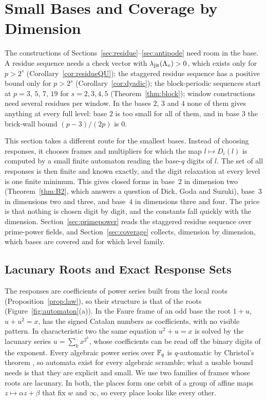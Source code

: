%
%
%
%
%
%
%
\section{Small Bases and Coverage by Dimension}\label{sec:frames}
The constructions of Sections~\ref{sec:residue}--\ref{sec:antipode} need room in the base. A residue sequence needs a check vector with $\lambda_{\mathrm{jit}}(\Lambda_v)>0$, which exists only for $p>2^s$ (Corollary~\ref{cor:residueQU}); the staggered residue sequence has a positive bound only for $p>2^s$ (Corollary~\ref{cor:dyadic}); the block-periodic sequences start at $p=3$, $5$, $7$, $19$ for $s=2,3,4,5$ (Theorem~\ref{thm:block}); window constructions need several residues per window. In the bases $2$, $3$ and $4$ none of them gives anything at every full level: base $2$ is too small for all of them, and in base $3$ the brick-wall bound $(p-3)/(2p)$ is $0$.

This section takes a different route for the smallest bases. Instead of choosing responses, it chooses frames and multipliers for which the map $l\mapsto D_i(l)$ is computed by a small finite automaton reading the base-$q$ digits of $l$. The set of all responses is then finite and known exactly, and the digit relaxation at every level is one finite minimum. This gives closed forms in base~$2$ in dimension two (Theorem~\ref{thm:B2}, which answers a question of Dick, Goda and Suzuki), base~$3$ in dimensions two and three, and base~$4$ in dimensions three and four. The price is that nothing is chosen digit by digit, and the constants fall quickly with the dimension. Section~\ref{sec:primepower} reads the staggered residue sequence over prime-power fields, and Section~\ref{sec:coverage} collects, dimension by dimension, which bases are covered and for which level family.

\subsection{Lacunary Roots and Exact Response Sets}\label{sec:automata}
The responses are coefficients of power series built from the local roots (Proposition~\ref{prop:law}), so their structure is that of the roots (Figure~\ref{fig:automaton}(a)). In the Faure frame of an odd base the root $1+u$, $u+u^2=x$, has the signed Catalan numbers as coefficients, with no visible pattern. In characteristic two the same equation $u^2+u=x$ is solved by the lacunary series $u=\sum_kx^{2^k}$, whose coefficients can be read off the binary digits of the exponent. Every algebraic power series over $\mathbb{F}_q$ is $q$-automatic by Christol's theorem \cite{Chr79,CKMR80}, so automata exist for every algebraic scramble; what a usable bound needs is that they are explicit and small. We use two families of frames whose roots are lacunary. In both, the places form one orbit of a group of affine maps $z\mapsto\alpha z+\beta$ that fix $w$ and $\infty$, so every place looks like every other.

